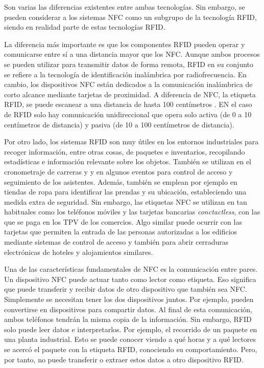 \documentclass[12pt,a4paper,onecolumn,oneside]{report}
\begin{document}
Son varias las diferencias existentes entre ambas tecnologías. Sin embargo, se pueden considerar a los sistemas NFC como un subgrupo de la tecnología RFID, siendo en realidad parte de estas tecnologías RFID.

La diferencia más importante es que los componentes RFID pueden operar y comunicarse entre sí a una distancia mayor que los NFC. Aunque ambos procesos se pueden utilizar para transmitir datos de forma remota, RFID en su conjunto se refiere a la tecnología de identificación inalámbrica por radiofrecuencia. En cambio, los dispositivos NFC están dedicados a la comunicación inalámbrica de corto alcance mediante tarjetas de proximidad. A diferencia de NFC, la etiqueta RFID, se puede escanear a una distancia de hasta 100 centímetros \cite{dos}. EN el caso de RFID solo hay comunicación unidireccional que opera solo activa (de 0 a 10 centímetros de distancia) y pasiva (de 10 a 100 centímetros de distancia).

Por otro lado, los sistemas RFID son muy útiles en los entornos industriales para recoger información, entre otras cosas, de paquetes e inventarios, recopilando estadísticas e información relevante sobre los objetos. También se utilizan en el cronometraje de carreras y y en algunos eventos para control de acceso y seguimiento de los asistentes. Además, también se emplean por ejemplo en tiendas de ropa para identificar las prendas y su ubicación, estableciendo una medida extra de seguridad. Sin embargo, las etiquetas NFC se utilizan en tan habituales como los teléfonos móviles y las tarjetas bancarias \textit{conctactless}, con las que se paga en los TPV de los comercios. Algo similar puede ocurrir con las tarjetas que permiten la entrada de las personas autorizadas a los edificios mediante sistemas de control de acceso y también para abrir cerraduras electrónicas de hoteles y alojamientos similares.

Una de las características fundamentales de NFC es la comunicación entre pares. Un dispositivo NFC puede actuar tanto como lector como etiqueta. Eso significa que puede transferir y recibir datos de otro dispositivo que también sea NFC. Simplemente se necesitan tener los dos dispositivos juntos. Por ejemplo, pueden convertirse en dispositivos para compartir datos. Al final de esta comunicación, ambos teléfonos tendrán la misma copia de la información. Sin embargo, RFID solo puede leer datos e interpretarlos. Por ejemplo, el recorrido de un paquete en una planta industrial. Esto se puede conocer viendo a qué horas y a qué lectores se acercó el paquete con la etiqueta RFID, conociendo su comportamiento. Pero, por tanto, no puede transferir o extraer estos datos a otro dispositivo RFID.
\end{document}
